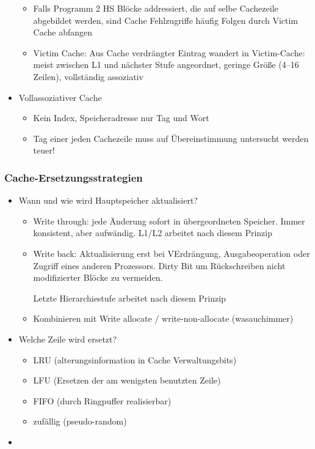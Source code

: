 \begin{itemize}
\begin{itemize}
\begin{itemize}
				\end{itemize}
			\item
				Falls Programm 2 HS Blöcke addressiert, die auf selbe Cachezeile abgebildet werden, sind Cache Fehlzugriffe häufig \Ra{} Folgen durch Victim Cache abfangen
			\item
				Victim Cache: Aus Cache verdrängter Eintrag wandert in Victim-Cache: meist zwischen L1 und nächster Stufe angeordnet, geringe Größe (4--16 Zeilen), vollständig assoziativ
		\end{itemize}
	\item
		Vollassoziativer Cache
		\begin{itemize}
			\item
				Kein Index, Speicheradresse nur Tag und Wort
			\item
				Tag einer jeden Cachezeile muss auf Übereinstimmung untersucht werden \ra{} teuer!
		\end{itemize}
\end{itemize}
\subsubsection{Cache-Ersetzungsstrategien}
\begin{itemize}
	\item
		Wann und wie wird Hauptspeicher aktualisiert?
		\begin{itemize}
			\item
				Write through: jede Änderung sofort in übergeordneten Speicher. Immer konsistent, aber aufwändig. L1/L2 arbeitet nach diesem Prinzip
			\item
				Write back: Aktualisierung erst bei VErdrängung, Ausgabeoperation oder Zugriff eines anderen Prozessors. Dirty Bit um Rückschreiben nicht modifizierter Blöcke zu vermeiden.

				Letzte Hierarchiestufe arbeitet nach diesem Prinzip
			\item
				Kombinieren mit Write allocate / write-non-allocate (wasauchimmer)
		\end{itemize}
	\item
		Welche Zeile wird ersetzt?
		\begin{itemize}
			\item
				LRU (alterungsinformation in Cache Verwaltungsbits)
			\item
				LFU (Ersetzen der am wenigsten benutzten Zeile)
			\item
				FIFO (durch Ringpuffer realisierbar)
			\item
				zufällig (pseudo-random)
		\end{itemize}
	\item
\end{itemize}
